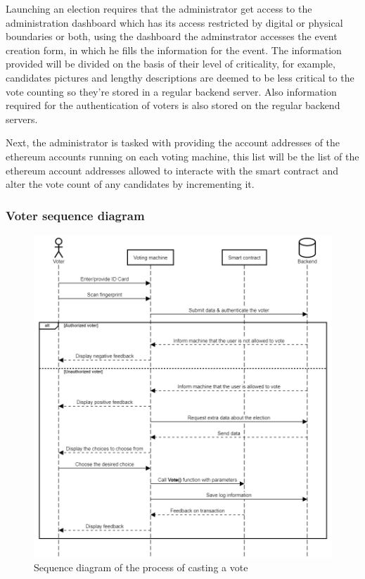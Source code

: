 Launching an election requires that the administrator get access to the administration dashboard which has its access restricted by digital or physical boundaries or both, using the dashboard the adminstrator accesses the event creation form, in which he fills the information for the event. The information provided will be divided on the basis of their level of criticality, for example, candidates pictures and lengthy descriptions are deemed to be less critical to the vote counting so they're stored in a regular backend server. Also information required for the authentication of voters is also stored on the regular backend servers.

Next, the administrator is tasked with providing the account addresses of the ethereum accounts running on each voting machine, this list will be the list of the ethereum account addresses allowed to interacte with the smart contract and alter the vote count of any candidates by incrementing it.

\subsubsection{Voter sequence diagram}

\begin{figure}[H]
	\centering
		\includegraphics[width=14cm]{images/chapter3/voter_sequence_diagram.png}
		\caption{{\footnotesize Sequence diagram of the process of casting a vote}}
\end{figure}

